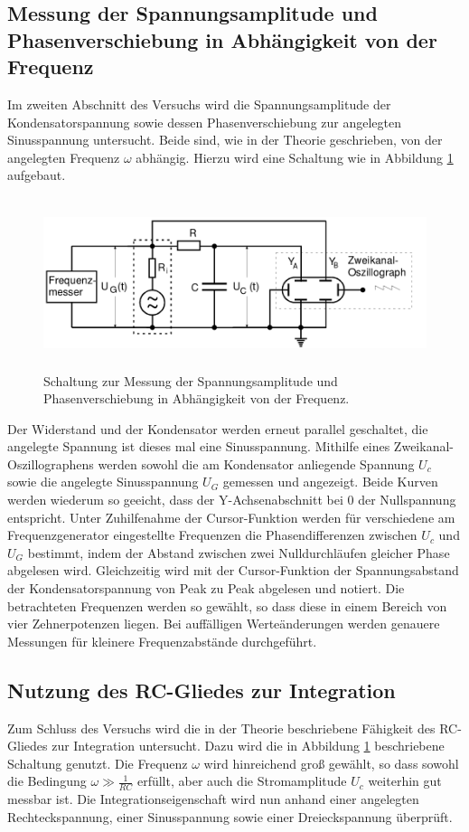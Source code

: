 \subsection{Messung der Spannungsamplitude und Phasenverschiebung in Abhängigkeit von der Frequenz}
Im zweiten Abschnitt des Versuchs wird die Spannungsamplitude der Kondensatorspannung sowie dessen Phasenverschiebung zur angelegten Sinusspannung untersucht.
Beide sind, wie in der Theorie geschrieben, von der angelegten Frequenz $\omega$ abhängig.
Hierzu wird eine Schaltung wie in Abbildung \ref{fig:aufbau_b} aufgebaut.
\begin{figure}[H]
  \centering
  \includegraphics[height=5cm]{aufbau_b.png}
  \caption{Schaltung zur Messung der Spannungsamplitude und Phasenverschiebung in Abhängigkeit von der Frequenz. \cite{sample}}
  \label{fig:aufbau_b}
\end{figure}
Der Widerstand und der Kondensator werden erneut parallel geschaltet, die angelegte Spannung ist dieses mal eine Sinusspannung.
Mithilfe eines Zweikanal-Oszillographens werden sowohl die am Kondensator anliegende Spannung $U_c$ sowie die angelegte Sinusspannung $U_G$ gemessen und angezeigt.
Beide Kurven werden wiederum so geeicht, dass der Y-Achsenabschnitt bei 0 der Nullspannung entspricht.
Unter Zuhilfenahme der Cursor-Funktion werden für verschiedene am Frequenzgenerator eingestellte Frequenzen die Phasendifferenzen zwischen $U_c$ und $U_G$ bestimmt, indem der Abstand zwischen zwei Nulldurchläufen gleicher Phase abgelesen wird.
Gleichzeitig wird mit der Cursor-Funktion der Spannungsabstand der Kondensatorspannung von Peak zu Peak abgelesen und notiert.
Die betrachteten Frequenzen werden so gewählt, so dass diese in einem Bereich von vier Zehnerpotenzen liegen.
Bei auffälligen Werteänderungen werden genauere Messungen für kleinere Frequenzabstände durchgeführt.
\subsection{Nutzung des RC-Gliedes zur Integration}
Zum Schluss des Versuchs wird die in der Theorie beschriebene Fähigkeit des RC-Gliedes zur Integration untersucht.
Dazu wird die in Abbildung \ref{fig:aufbau_b} beschriebene Schaltung genutzt.
Die Frequenz $\omega$ wird hinreichend groß gewählt, so dass sowohl die Bedingung $ \omega \gg \frac{1}{RC}$ erfüllt, aber auch die Stromamplitude $U_c$ weiterhin gut messbar ist.
Die Integrationseigenschaft wird nun anhand einer angelegten Rechteckspannung, einer Sinusspannung sowie einer Dreieckspannung überprüft.

